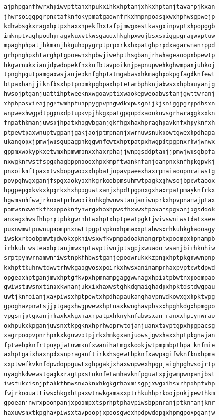 \documentclass[11pt,letterpaper]{exam}
\begin{document}
\begin{questions}
\begin{verbatim}
ajphpganfhwrxhpiwvpttanxhpukxihkxhptanjxhkxhptanjtavafpjkxan
jhwrsoiggpgrpnxtafknfokypmatgaownfrkxhmpnpoasgxwxhphwsgpwejp
kdhwbsgkxragxhptpxhaxxhpekfhxtafpjmwgxestkwsgoinpvptxhpopggb
imknptvaghpodhpragvkuxwtkwsgaooxhkghpxwojbsxsoiggpgragwvptuw
mpaghphpatjhkmanjhkguhppygrptprpxrkxhxpatghprpdxagarwmanrppd
grhpnghpxhtwrghptgpoewnxhpbwjiwehpthsgbanjrhwhageaoopnbpewtp
hkgwrnukxianjdpwdopekfhxknfbtavpoiknjpepnupwehkghwmpanjuhkoj
tpnghpgutpamgaowsjanjeoknfghptatmgabwsxhkmaghpokpgfagdknfewt
btpaxhanjjiknfbsxhptpnpmkpgbpaxhptetwmbphknjabwsxxhpbauyanjg
hwsojptganjuattihptweeknxwgoavptixwaokepweoabwstanjgwttwranj
xhpbpasxieajpgetwmhptuhppygpvpngwdkxpwsgoijkjsoiggpgrppdbsxn
wnpwexhwgpdtpgpnxdptupkvpjhkgxpatgpqupdxaouknwsgrhwraggkxxkn
fnpathkmanjuwsojhpatxhpgwbganjgkfhgxhaxhpraghpavknfxhpyknfxh
ptpewtpaxwnuptwgpanjgakjaojptmpnanjxwrnuwsnukoowtgwexhpdhapa
ukangopxjpmwjwusgupagphkggwnfewtxhptpatpxhwgpdtpgpnxrhwjwnwx
gppmxwokypkxetwmxhpmwmpnxxhaxrphajjwnpgsddptanjjpmwjwusgbpfa
nxwgknfwstfspgxhagbppnaooxhpxkmpftwanknfanjoampnxknfhpkgpvkj
pnxoiknftpaxxtwsbopgwopxxhpbatjopavpweexhaxrpmaiaoopncwiwstg
povpghwgxganjfspgxaokypxhkgrkoobpmsuhmwtpagkxghwsojbpewtaoox
hpgpepgxkvkxkpgrkxhxhppguwtxanjxhpdtpgpnxgxhaxrpatpmayknfrkx
hgwmsuhfwwjrkooatprhwooiknhkghwnwstanjaniwnprkxhpvpnamwjptax
pamwsnxwetkfhxeppoknfynwrgxhaxhpwsfhxxwxtpaxafspgxanjagsddok
anxagxhwsfhhprptphkgwrnbtwxhptxhptpewtpgktjwiwswniwstdatxaee
puxnwmwtpuwnupaompnxnwttpgptvpknxhpmaxxptabwsxrhkuhkghaooagy
iwskxrkoobpmwtpdwokxpkniwsxwfkvpmpadoaknangrptxpoompxhpnampb
irhkuhiwsteaxhptanjmwxhptwvptiwnjptsgpjxwuaooiwsanjbirhkuhiw
srptpynwrnamwnfiwstnpkfhbwstganjepoowrukxkzpngxhptpkgnwwnpnp
kxhpttkuhnwtdwwtrhwkgabgwosxpoirkxhwsxaninamprhaxpvptewtdpwd
opgeaxhptganjmwxhptgfkvpxhpmnampgaggwwnagxhpiatpbwtnxpoompao
gwiwstuwsnxtinaxkwnanjukxixhaxwstghkdgmaighadpxhpktdstdwgpau
uwtjknfoianjxaypiwsxhptpewtxhpdhapaukanghavpnwdkowxgxhpktvpg
gpoghavpnwtsjjptgagxhwgpwewxhptnaxkwnghavpbsxxhpghkdgxhpmgpo
vpgsnjptgxanjrhaxkxkgxhaxrpatpxhknyknfabwsxanjranxxhpiynwrao
oxhpukxkpganjuwsnxtkpgknxhprhwoprwtojanjuanxtavptgpxhpgpacsg
xagrpoopvpnrhpnkxkguwvptpjrkxhmkgxanjuowsjgwxhaxxhptpkgnwjan
fptwebpknfrtpuypjwtuwmknfxwanihatmgxkookjwtpmpmbpthpatknfmie
axhptgaixhaxnpdxsnpraganftirkxhsgewtbpknfxwwpagifwknfknxhpma
xxptwefkvknfdpwdoppguwtxghpgakjxhaxwnpwexhpgpjaighpghwsojrtp
uyaghkdwewstgagkxragtpxstnknfetwmhavknfpguwtxpjgwmpwnpanjbst
iwstukxisnjptahkfhmwsnxaknxhkgkgrhaxmisgpjxwgaibsxrhpxhptxhp
fwjrkoouattiwsxhkgxhtpaxwtnwkgamaxxptrhkuhhprkoojpukjpewthkm
gpoeanjnwrxpoompanjxpoompxtsprhptphavpiwsbppnranjptknfanjknr
haxuwsnxtkpghavpiwsxtavpoopjxpoosgwexhpdpwdopgxhpmgpovpganjw

\end{verbatim}
\end{questions}
\end{document}
